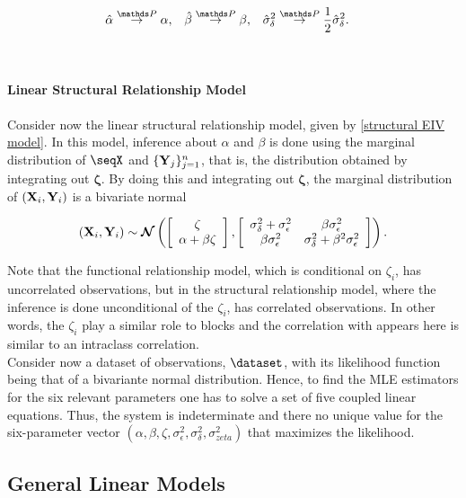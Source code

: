 \documentclass{homework}
\begin{document}
\begin{align}
    \hat{\alpha}  &\overset{\prob}{\rightarrow} \alpha, & \hat{\beta}  &\overset{\prob}{\rightarrow} \beta ,& \hat{\sigma}^2_\delta  &\overset{\prob}{\rightarrow} \frac{1}{2}\hat{\sigma}^2_\delta.
\end{align}

\blank \\

\paragraph{\textbf{Linear Structural Relationship Model}}

Consider now the linear structural relationship model, given by \eqref{structural EIV model}. In this model, inference about $\alpha$ and $\beta$ is done using the marginal distribution of $\seqX$ and $\{{\bf Y}_j\}_{j=1}^{n}$, that is, the distribution obtained by integrating out $\bm{\zeta}$. By doing this and integrating out $\bm{\zeta}$, the marginal distribution of $({\bf X}_i,{\bf Y}_i)$ is a bivariate normal 

$$
    ({\bf X}_i,{\bf Y}_i) \sim \bm{\mathcal{N}}\left( \left[\begin{array}{c}
         \zeta  \\
         \alpha + \beta \zeta 
    \end{array}\right], \left[\begin{array}{cc}
        \sigma_{\delta}^2 + \sigma_{\epsilon}^2 & \beta \sigma_{\epsilon}^2  \\
        \beta \sigma_{\epsilon}^2 &   \sigma_{\delta}^2 + \beta^2 \sigma_{\epsilon}^2
    \end{array} \right] \right).
$$

Note that the functional relationship model, which is conditional on ${\zeta}_i$, has uncorrelated observations, but in the structural relationship model, where the inference is done unconditional of the $\zeta_i$, has correlated observations. In other words, the $\zeta_i$ play a similar role to blocks and the correlation with appears here is similar to an intraclass correlation. \\

Consider now a dataset of observations, $\dataset$, with its likelihood function being that of a bivariante normal distribution. Hence, to find the MLE estimators for the six relevant parameters one has to solve a set of five coupled linear equations. Thus, the system is indeterminate and there no unique value for the six-parameter vector $(\alpha, \beta, \zeta, \sigma_{\epsilon}^2, \sigma_{\delta}^2, \sigma_{zeta}^2)$ that maximizes the likelihood. 

\subsection{General Linear Models}
\end{document}

